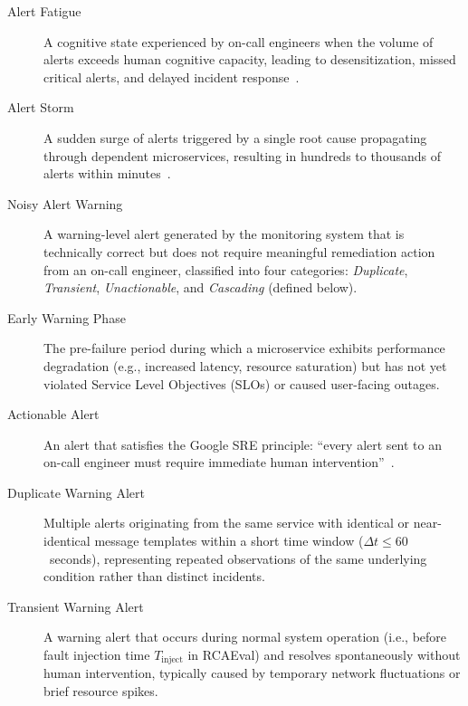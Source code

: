 \begin{description}


\item[Alert Fatigue]
A cognitive state experienced by on-call engineers when the volume of alerts exceeds human cognitive capacity, leading to desensitization, missed critical alerts, and delayed incident response~\cite{pagerduty2020, grafana2025}.

\item[Alert Storm]
A sudden surge of alerts triggered by a single root cause propagating through dependent microservices, resulting in hundreds to thousands of alerts within minutes~\cite{kuang2024cola}.

\item[Noisy Alert Warning]
A warning-level alert generated by the monitoring system that is technically correct but does not require meaningful remediation action from an on-call engineer, classified into four categories: \textit{Duplicate}, \textit{Transient}, \textit{Unactionable}, and \textit{Cascading} (defined below).

\item[Early Warning Phase]
The pre-failure period during which a microservice exhibits performance degradation (e.g., increased latency, resource saturation) but has not yet violated Service Level Objectives (SLOs) or caused user-facing outages.

\item[Actionable Alert]
An alert that satisfies the Google SRE principle: ``every alert sent to an on-call engineer must require immediate human intervention''~\cite{google-sre-ch10, google-sre-ch11}.


\item[Duplicate Warning Alert]
Multiple alerts originating from the same service with identical or near-identical message templates within a short time window ($\Delta t \le 60$~seconds), representing repeated observations of the same underlying condition rather than distinct incidents.

\item[Transient Warning Alert]
A warning alert that occurs during normal system operation (i.e., before fault injection time $T_{\text{inject}}$ in RCAEval) and resolves spontaneously without human intervention, typically caused by temporary network fluctuations or brief resource spikes.


\end{description}
